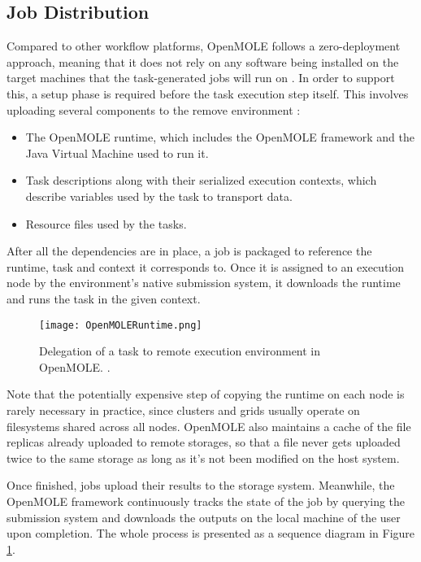 \subsection{Job Distribution}

Compared to other workflow platforms, OpenMOLE follows a zero-deployment approach, meaning that it does not rely on any software being installed on the target machines that the task-generated jobs will run on \cite{Reuillon2013}. In order to support this, a setup phase is required before the task execution step itself. This involves uploading several components to the remove environment \cite{Reuillon2010}:

\begin{itemize}
	\item The OpenMOLE runtime, which includes the OpenMOLE framework and the Java Virtual Machine used to run it.
	\item Task descriptions along with their serialized execution contexts, which describe variables used by the task to transport data.
	\item Resource files used by the tasks.
\end{itemize}

After all the dependencies are in place, a job is packaged to reference the runtime, task and context it corresponds to. Once it is assigned to an execution node by the environment's native submission system, it downloads the runtime and runs the task in the given context. 

\begin{figure}[H]
	\centering
		\texttt{[image: OpenMOLERuntime.png]}
	\caption{Delegation of a task to remote execution environment in OpenMOLE. \cite{Reuillon2010}.}
	\label{OpenMOLERuntime}
\end{figure}

Note that the potentially expensive step of copying the runtime on each node is rarely necessary in practice, since clusters and grids usually operate on filesystems shared across all nodes. OpenMOLE also maintains a cache of the file replicas already uploaded to remote storages, so that a file never gets uploaded twice to the same storage as long as it's not been modified on the host system.

Once finished, jobs upload their results to the storage system. Meanwhile, the OpenMOLE framework continuously tracks the state of the job by querying the submission system and downloads the outputs on the local machine of the user upon completion. The whole process is presented as a sequence diagram in Figure \ref{OpenMOLERuntime}.

